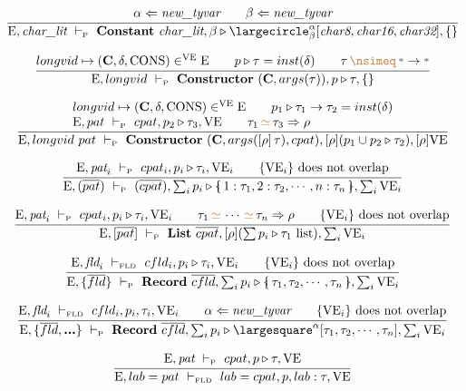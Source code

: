 \documentclass[11pt,a4paper]{article}
\newcommand{\key}[1]{\textrm{\textbf{#1}}}
\newcommand{\prodlhs}[1]{\textit{#1}}
\newcommand{\record}[1]{\{\!\!\shortmid #1 \shortmid\!\!\}}
\newcommand{\overld}[3]{\largecircle^{#1}_{#2}{#3}}
\newcommand{\irecrd}[2]{\largesquare^{#1}{#2}}
\newcommand{\qualtype}[2]{#1 \triangleright #2}
\newcommand{\unify}[3]{#1\,{\color{brown}{\simeq}}\,#2 \Rightarrow #3}
\newcommand{\unifylist}[3]{#1\,{\color{brown}{\simeq}}\,\cdots\,{\color{brown}{\simeq}}\,#2 \Rightarrow #3}
\newcommand{\notunifiable}[2]{#1\,{\color{brown}{\nsimeq}}\,#2}
\newcommand{\subst}[2]{[#1]\,#2}
\newcommand{\braced}[1]{\{#1\}}
\newcommand{\wildcard}{{\color{gray}\scriptstyle\textbf{*}}}
\newcommand{\litchar}{\textit{char\_lit}}
\newcommand{\Char}[1]{\textit{char#1}}
\newcommand{\Env}  {\textrm{E}}
\newcommand{\VE}   {\textrm{VE}}
\newcommand{\VKC}  {\textrm{CONS}}
\newcommand{\vcon} {\mathbf{C}}
\newcommand{\Empty}{\braced{}}
\newcommand{\vdashP}  {\ \vdash_{\textrm{\tiny P}}\  }
\newcommand{\vdashFLD}{\ \vdash_\textrm{\tiny FLD}\  }
\newcommand{\corenew}[1]{\textit{new\_#1}}
\newcommand{\vect}[1]{\overline{#1}}
\begin{document}
\[
\cfrac
 {\alpha \Leftarrow \corenew{tyvar} \qquad
  \beta  \Leftarrow \corenew{tyvar}}
 {\Env, \litchar \vdashP 
    \key{Constant}\ \litchar, \qualtype{\beta}{\overld{\alpha}{\beta}{[\Char{8},\Char{16},\Char{32}]}}, \Empty}
\]

\[
\cfrac
 {longvid \mapsto (\vcon, \delta, \VKC) \in^\VE \Env \qquad
  \qualtype{p}{\tau} = inst(\delta)    \qquad
  \notunifiable{\tau}{\wildcard \to \wildcard} }
 {\Env, longvid \vdashP \key{Constructor}\ (\vcon, args(\tau)), \qualtype{p}{\tau}, \Empty}
\]

\[
\cfrac
 {\begin{array}{l}
  longvid \mapsto (\vcon, \delta, \VKC) \in^\VE \Env     \qquad
  \qualtype{p_1}{\tau_1\to\tau_2} = inst(\delta)         \\
  \Env,pat \vdashP cpat, \qualtype{p_2}{\tau_3},\VE      \qquad
  \unify{\tau_1}{\tau_3}{\rho}                           \\
  \end{array}}
 {\Env, longvid\ pat \vdashP \key{Constructor}\ (\vcon, args(\subst{\rho}{\tau}), cpat), [\rho](\qualtype{p_1 \cup p_2}{\tau_2}), [\rho]\VE}
\]

\[
\cfrac
 {\Env,\prodlhs{pat}_i \vdashP cpat_i,\qualtype{p_i}{\tau_i},\VE_i \qquad
  \braced{\VE_i}\ \textrm{does not overlap}}
 {\Env, (\vect{pat}) \vdashP
  (\vect{cpat}), \qualtype{\sum_i p_i}{\record{1:\tau_1,2:\tau_2,\cdots,n:\tau_n}}, \sum_i\VE_i}
\]

\[
\cfrac
 {\Env,\prodlhs{pat}_i \vdashP cpat_i,\qualtype{p_i}{\tau_i},\VE_i  \qquad
  \unifylist{\tau_1}{\tau_n}{\rho}                                  \qquad
  \braced{\VE_i}\ \textrm{does not overlap}}
 {\Env, [\vect{pat}] \vdashP
    \key{List}\ \vect{cpat}, [\rho](\qualtype{\sum p_i}{\tau_1\ \textrm{list}}), \sum_i\VE_i}
\]

\[
\cfrac
 {\Env,\prodlhs{fld}_i \vdashFLD cfld_i,\qualtype{p_i}{\tau_i},\VE_i \qquad
  \braced{\VE_i}\ \textrm{does not overlap}}
 {\Env, \braced{\vect{fld}} \vdashP
    \key{Record}\ \vect{cfld}, \qualtype{\sum_i p_i}{\record{\tau_1,\tau_2,\cdots,\tau_n}}, \sum_i\VE_i}
\]

\[
\cfrac
 {\Env,\prodlhs{fld}_i \vdashFLD cfld_i,p_i,\tau_i,\VE_i \qquad
  \alpha \Leftarrow \corenew{tyvar}                      \qquad
  \braced{\VE_i}\ \textrm{does not overlap}}
 {\Env, \braced{\vect{fld},\key{...}} \vdashP
    \key{Record}\ \vect{cfld}, \qualtype{\sum_i p_i}{\irecrd{\alpha}{[\tau_1,\tau_2,\cdots,\tau_n]}}, \sum_i\VE_i}
\]

\[
\cfrac
 {\Env,\prodlhs{pat} \vdashP cpat, \qualtype{p}{\tau}, \VE}
 {\Env, lab = pat \vdashFLD lab=cpat, p, lab:\tau, \VE }
\]
\end{document}

